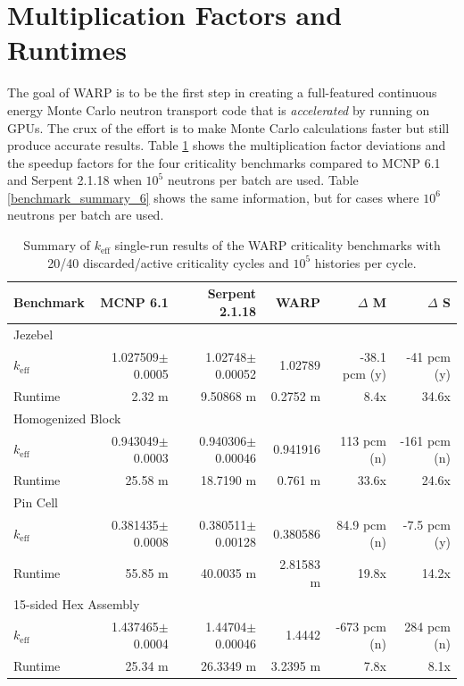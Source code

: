 \section{Multiplication Factors and Runtimes}

The goal of WARP is to be the first step in creating a full-featured continuous energy Monte Carlo neutron transport code that is \emph{accelerated} by running on GPUs.  The crux of the effort is to make Monte Carlo calculations faster but still produce accurate results.  Table \ref{benchmark_summary_5} shows the multiplication factor deviations and the speedup factors for the four criticality benchmarks compared to MCNP 6.1 and Serpent 2.1.18 when $10^5$ neutrons per batch are used.  Table  \ref{benchmark_summary_6} shows the same information, but for cases where $10^6$ neutrons per batch are used.

\begin{table}[h]
\centering
\caption{Summary of $k_\mathrm{eff}$ single-run results of the WARP criticality benchmarks with 20/40 discarded/active criticality cycles and $10^5$ histories per cycle.}
\label{benchmark_summary_5}
\begin{tabular}{| l | r | r | r | r | r |}
 \hline
 Benchmark & MCNP 6.1 & Serpent 2.1.18 & WARP & $\Delta$ M & $\Delta$ S  \\
\hline
\hline
\multicolumn{6}{|l|}{Jezebel}  \\
\hline
 $k_\mathrm{eff}$ & 1.027509$\pm$0.0005 & 1.02748$\pm$0.00052 & 1.02789 & -38.1 pcm (y) & -41 pcm (y) \\
 \hline
 Runtime               & 2.32 m & 9.50868 m & 0.2752 m & 8.4x  & 34.6x  \\
 \hline
 \hline
\multicolumn{6}{|l|}{Homogenized Block }\\
\hline
 $k_\mathrm{eff}$ & 0.943049$\pm$0.0003 & 0.940306$\pm$0.00046 & 0.941916 & 113 pcm (n)  & -161 pcm  (n) \\
 \hline
 Runtime               &  25.58 m & 18.7190 m & 0.761 m & 33.6x  & 24.6x  \\
 \hline
  \hline
\multicolumn{6}{|l|}{Pin Cell}\\
\hline
 $k_\mathrm{eff}$ & 0.381435$\pm$0.0008 &  0.380511$\pm$0.00128 & 0.380586 & 84.9 pcm (n)&  -7.5 pcm (y)    \\
 \hline
 Runtime               & 55.85 m & 40.0035 m &  2.81583 m &  19.8x & 14.2x  \\
 \hline
  \hline
\multicolumn{6}{|l|}{15-sided Hex Assembly}\\
\hline
 $k_\mathrm{eff}$ & 1.437465$\pm$0.0004 & 1.44704$\pm$0.00046 & 1.4442 & -673 pcm (n) & 284 pcm (n) \\
 \hline
 Runtime               & 25.34 m &  26.3349 m &  3.2395 m  & 7.8x & 8.1x  \\
 \hline
\end{tabular}
\end{table}


